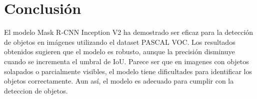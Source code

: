 \documentclass{article}
\begin{document}
\section{Conclusión}
El modelo Mask R-CNN Inception V2 ha demostrado ser eficaz para la detección de objetos en imágenes utilizando el dataset PASCAL VOC. 
Los resultados obtenidos sugieren que el modelo es robusto, aunque la precisión disminuye cuando se incrementa el umbral de IoU. 
Parece ser que en imagenes con objetos solapados o parcialmente visibles, el modelo tiene dificultades para identificar los objetos correctamente.
Aun así, el modelo es adecuado para cumplir con la deteccion de objetos. 



\end{document}
